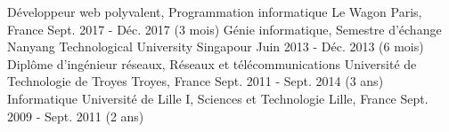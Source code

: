 
\begin{cventries}

  \cventry
    {Développeur web polyvalent, Programmation informatique} %
    {Le Wagon} %
    {Paris, France} %
    {Sept. 2017 - Déc. 2017 (3 mois)} %
    {}
  \cventry
    {Génie informatique, Semestre d'échange} %
    {Nanyang Technological University} %
    {Singapour} %
    {Juin 2013 - Déc. 2013 (6 mois)} %
    {}
  \cventry
    {Diplôme d'ingénieur réseaux, Réseaux et télécommunications} %
    {Université de Technologie de Troyes} %
    {Troyes, France} %
    {Sept. 2011 - Sept. 2014 (3 ans)} %
    {}
  \cventry
    {Informatique} %
    {Université de Lille I, Sciences et Technologie} %
    {Lille, France} %
    {Sept. 2009 - Sept. 2011 (2 ans)} %
    {}
\end{cventries}
